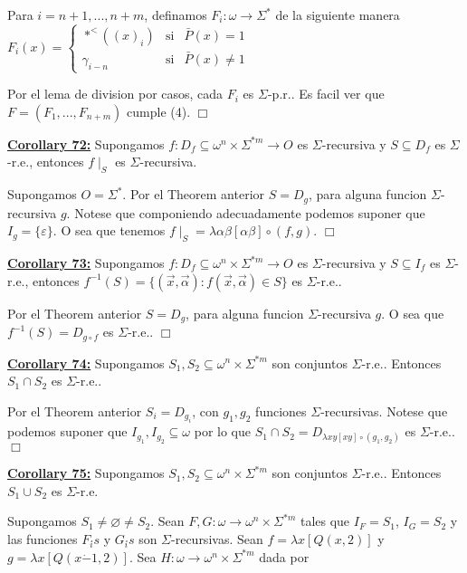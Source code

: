 Para \(i=n+1,...,n+m\), definamos \(F_{i}:\omega \rightarrow \Sigma ^{\ast }\) de la siguiente manera
\(\displaystyle F_{i}(x)=\left\{ \begin{array}{lll} \ast ^{< }((x)_{i}) & \text{si} & \bar{P}(x)=1 \\ \gamma _{i-n} & \text{si} & \bar{P}(x)\neq 1 \end{array} \right. \)

Por el lema de division por casos, cada \(F_{i}\) es \(\Sigma \)-p.r.. Es facil ver que \(F=(F_{1},...,F_{n+m})\) cumple (4). \(\Box\)


\textbf{\underline{Corollary 72:}} Supongamos \(f:D_{f}\subseteq \omega ^{n}\times \Sigma ^{\ast m}\rightarrow O\) es \(\Sigma \)-recursiva y \(S\subseteq D_{f}\) es \( \Sigma \)-r.e., entonces \(f\mid _{S}\) es \(\Sigma \)-recursiva.


\PROOF Supongamos \(O=\Sigma ^{\ast }.\) Por el Theorem anterior \(S=D_{g}\), para alguna funcion \(\Sigma \)-recursiva \(g.\) Notese que componiendo adecuadamente podemos suponer que \(I_{g}=\{\varepsilon \}.\) O sea que tenemos \(f\mid _{S}=\lambda \alpha \beta \left[ \alpha \beta \right] \circ (f,g)\). \(\Box\)


\textbf{\underline{Corollary 73:}} Supongamos \(f:D_{f}\subseteq \omega ^{n}\times \Sigma ^{\ast m}\rightarrow O\) es \(\Sigma \)-recursiva y \(S\subseteq I_{f}\) es \(\Sigma \)-r.e., entonces \( f^{-1}(S)=\{(\vec{x},\vec{\alpha}):f(\vec{x},\vec{\alpha})\in S\}\) es \( \Sigma \)-r.e..

\PROOF Por el Theorem anterior \(S=D_{g}\), para alguna funcion \(\Sigma \)-recursiva \( g \). O sea que \(f^{-1}(S)=D_{g\circ f}\) es \(\Sigma \)-r.e.. \(\Box\)


\textbf{\underline{Corollary 74:}} Supongamos \(S_{1},S_{2}\subseteq \omega ^{n}\times \Sigma ^{\ast m}\) son conjuntos \(\Sigma \)-r.e.. Entonces \(S_{1}\cap S_{2}\) es \(\Sigma \)-r.e..

\PROOF Por el Theorem anterior \(S_{i}=D_{g_{i}}\), con \(g_{1},g_{2}\) funciones \( \Sigma \)-recursivas\(.\) Notese que podemos suponer que \(I_{g_{1}},I_{g_{2}} \subseteq \omega \) por lo que \(S_{1}\cap S_{2}=D_{\lambda xy\left[ xy\right] \circ (g_{1},g_{2})}\) es \(\Sigma \)-r.e.\(.\) \(\Box\)


\textbf{\underline{Corollary 75:}} Supongamos \(S_{1},S_{2}\subseteq \omega ^{n}\times \Sigma ^{\ast m}\) son conjuntos \(\Sigma \)-r.e.. Entonces \(S_{1}\cup S_{2}\) es \(\Sigma \)-r.e.

\PROOF Supongamos \(S_{1}\neq \varnothing \neq S_{2}.\) Sean \(F,G:\omega \rightarrow \omega ^{n}\times \Sigma ^{\ast m}\) tales que \(I_{F}=S_{1}\), \(I_{G}=S_{2}\) y las funciones \(F_{i} {\acute{}} s\) y \(G_{i} {\acute{}} s\) son \(\Sigma \)-recursivas. Sean \(f=\lambda x\left[ Q(x,2)\right] \) y \( g=\lambda x\left[ Q(x\dot{-}1,2)\right] .\) Sea \(H:\omega \rightarrow \omega ^{n}\times \Sigma ^{\ast m}\) dada por

